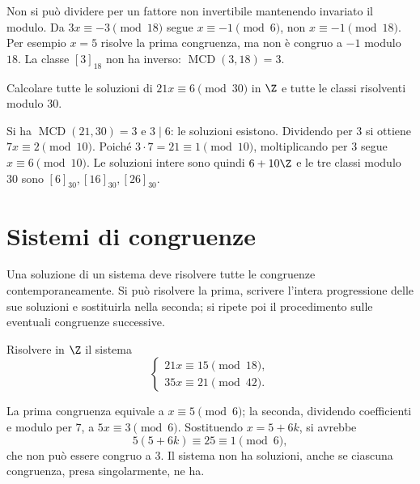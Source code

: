 \begin{osservazione}
Non si può dividere per un fattore non invertibile mantenendo invariato il modulo. Da $3x\equiv-3\pmod{18}$ segue $x\equiv-1\pmod6$, non $x\equiv-1\pmod{18}$. Per esempio $x=5$ risolve la prima congruenza, ma non è congruo a $-1$ modulo $18$. La classe $[3]_{18}$ non ha inverso: $\operatorname{MCD}(3,18)=3$.
\end{osservazione}

\begin{esercizio}
Calcolare tutte le soluzioni di $21x\equiv6\pmod{30}$ in $\Z$ e tutte le classi risolventi modulo $30$.
\end{esercizio}
\begin{svolgimento}
Si ha $\operatorname{MCD}(21,30)=3$ e $3\mid6$: le soluzioni esistono. Dividendo per $3$ si ottiene $7x\equiv2\pmod{10}$. Poiché $3\cdot7=21\equiv1\pmod{10}$, moltiplicando per $3$ segue $x\equiv6\pmod{10}$. Le soluzioni intere sono quindi $6+10\Z$ e le tre classi modulo $30$ sono $[6]_{30},[16]_{30},[26]_{30}$.
\end{svolgimento}

\section{Sistemi di congruenze}
Una soluzione di un sistema deve risolvere tutte le congruenze contemporaneamente. Si può risolvere la prima, scrivere l'intera progressione delle sue soluzioni e sostituirla nella seconda; si ripete poi il procedimento sulle eventuali congruenze successive.

\begin{esercizio}
Risolvere in $\Z$ il sistema
\[
\begin{cases}
21x\equiv15\pmod{18},\\
35x\equiv21\pmod{42}.
\end{cases}
\]
\end{esercizio}
\begin{svolgimento}
La prima congruenza equivale a $x\equiv5\pmod6$; la seconda, dividendo coefficienti e modulo per $7$, a $5x\equiv3\pmod6$. Sostituendo $x=5+6k$, si avrebbe
\[
5(5+6k)\equiv25\equiv1\pmod6,
\]
che non può essere congruo a $3$. Il sistema non ha soluzioni, anche se ciascuna congruenza, presa singolarmente, ne ha.
\end{svolgimento}

